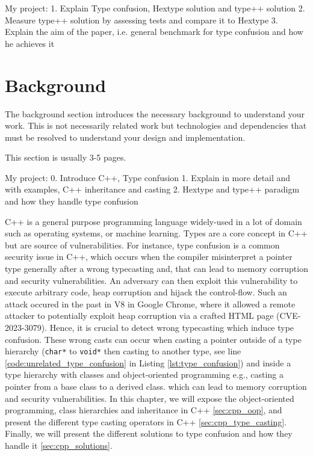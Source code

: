 \documentclass[a4paper,11pt,oneside]{report}
\begin{document}
My project: 
1. Explain Type confusion, Hextype solution and type++ solution
2. Measure type++ solution by assessing tests and compare it to Hextype
3. Explain the aim of the paper, i.e. general benchmark for type confusion and how he achieves it

\chapter{Background}

The background section introduces the necessary background to understand your
work. This is not necessarily related work but technologies and dependencies
that must be resolved to understand your design and implementation.

This section is usually 3-5 pages.

My project:
0. Introduce C++, Type confusion
1. Explain in more detail and with examples, C++ inheritance and casting
2. Hextype and type++ paradigm and how they handle type confusion

C++ is a general purpose programming language widely-used in a lot of domain such as operating systems, 
or machine learning. Types are a core concept in C++ but are source of vulnerabilities. For instance, type confusion 
is a common security issue in C++, which occurs when the compiler misinterpret a pointer type generally after a wrong typecasting and,
that can lead to memory corruption and security vulnerabilities. An adversary can then exploit this vulnerability to execute arbitrary code, heap corruption and hijack the control-flow.
Such an attack occured in the past in V8 in Google Chrome, where it allowed a remote attacker to potentially exploit
heap corruption via a crafted HTML page (CVE-2023-3079). Hence, it is crucial to detect wrong typecasting which induce type confusion. 
These wrong casts can occur when casting a pointer outside of a type hierarchy (\texttt{char*} to \texttt{void*} then casting to another type, see line \ref{code:unrelated_type_confusion} in Listing \autoref{lst:type_confusion}) 
and inside a type hierarchy with classes and object-oriented programming e.g., casting a pointer from a base class to a derived class. 
which can lead to memory corruption and security vulnerabilities. In this chapter, we will
expose the object-oriented programming, class hierarchies and inheritance in C++ \autoref{sec:cpp_oop}, 
and present the different type casting operators in C++ \autoref{sec:cpp_type_casting}. 
Finally, we will present the different solutions to type confusion and how they handle it \autoref{sec:cpp_solutions}.
\end{document}
